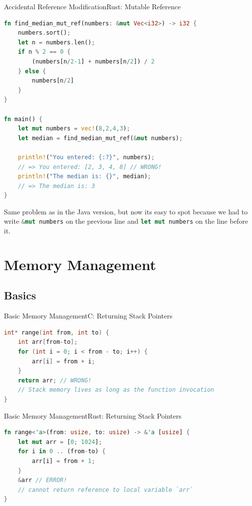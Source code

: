 \begin{Frame}[fragile]{Accidental Reference Modification}{Rust: Mutable Reference}
\begin{lstlisting}[language=Rust]
fn find_median_mut_ref(numbers: &mut Vec<i32>) -> i32 {
    numbers.sort();
    let n = numbers.len();
    if n % 2 == 0 {
        (numbers[n/2-1] + numbers[n/2]) / 2
    } else {
        numbers[n/2]
    }
}

fn main() {
    let mut numbers = vec!(8,2,4,3);
    let median = find_median_mut_ref(&mut numbers);
    
    println!("You entered: {:?}", numbers);
    // => You entered: [2, 3, 4, 8] // WRONG!
    println!("The median is: {}", median);
    // => The median is: 3
}
\end{lstlisting}

\scriptsize
Same problem as in the Java version, but now its easy to spot because we had to write
\lstinline[language=Rust]|&mut numbers| on the previous line and
\lstinline[language=Rust]|let mut numbers| on the line before it.\par
\end{Frame}

\section{Memory Management}

\subsection{Basics}

\begin{Frame}[fragile]{Basic Memory Management}{C: Returning Stack Pointers}
\begin{lstlisting}[language=C]
int* range(int from, int to) {
    int arr[from-to];
    for (int i = 0; i < from - to; i++) {
        arr[i] = from + i;
    }
    return arr; // WRONG!
    // Stack memory lives as long as the function invocation
}
\end{lstlisting}
\end{Frame}

\begin{Frame}[fragile]{Basic Memory Management}{Rust: Returning Stack Pointers}
\begin{lstlisting}[language=Rust]
fn range<'a>(from: usize, to: usize) -> &'a [usize] {
    let mut arr = [0; 1024];
    for i in 0 .. (from-to) {
        arr[i] = from + 1;
    }
    &arr // ERROR!
    // cannot return reference to local variable `arr`
}
\end{lstlisting}
\end{Frame}

